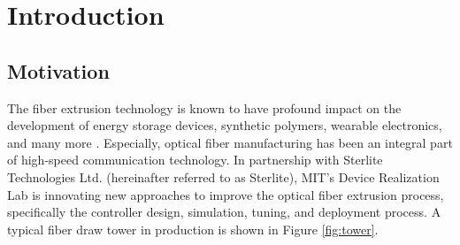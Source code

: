 
%


\chapter{Introduction} \label{ch:intro}

\section{Motivation} \label{ch:intro:motiv}

The fiber extrusion technology is known to have profound impact on the development of energy storage devices, synthetic polymers, wearable electronics, and many more \cite{synthetic, wearable_energy1, wearable_energy2}. Especially, optical fiber manufacturing has been an integral part of high-speed communication technology. In partnership with Sterlite Technologies Ltd. (hereinafter referred to as Sterlite), MIT's Device Realization Lab is innovating new approaches to improve the optical fiber extrusion process, specifically the controller design, simulation, tuning, and deployment process. A typical fiber draw tower in production is shown in Figure \ref{fig:tower}. 

